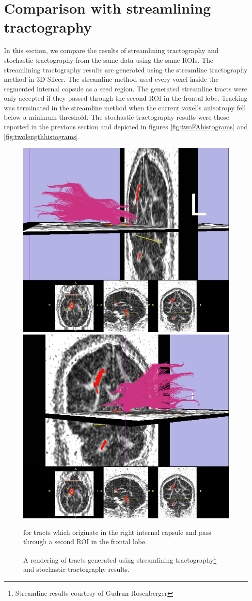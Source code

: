 \section{Comparison with streamlining tractography}
In this section, we compare the results of streamlining tractography and stochastic tractography from the same data using the same ROIs.  The streamlining tractography results are generated using the streamline tractography method in 3D Slicer.  The streamline method used every voxel inside the segmented internal capsule as a seed region.  The generated streamline tracts were only accepted if they passed through the second ROI in the frontal lobe.  Tracking was terminated in the streamline method when the current voxel's anisotropy fell below a minimum threshold.  The stochastic tractography results were those reported in the previous section and depicted in figures \ref{fig:twoFAhistograms} and \ref{fig:twolengthhistograms}.

\begin{figure}
	  \includegraphics[width=0.75\linewidth]
	    {slicer-0016}
	  \includegraphics[width=0.75\linewidth]
	    {slicer-0018}
	  \caption{A rendering of tracts generated using streamlining tractography\footnote{Streamline results courtesy of Gudrun Rosenberger} and stochastic tractography results.} for tracts which originate in the right internal capsule and pass through a second ROI in the frontal lobe.
	  \label{fig:streamlinerendering}
\end{figure}

